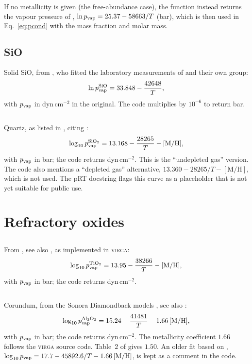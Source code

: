 \documentclass[11pt,a4paper]{article}
\newcommand{\pvap}{p_{\rm vap}}
\newcommand{\MH}{[\mathrm{M/H}]}
\newcommand{\chem}[1]{\mathrm{#1}}
\begin{document}
If no metallicity is given (the free-abundance case), the function instead
returns the \chem{MgSiO_3} vapour pressure of \citet{barshay1976},
$\ln\pvap = 25.37 - 58663/T$ (bar), which is then used in
Eq.~\eqref{eq:pcond} with the \chem{Mg_2SiO_4} mass fraction and molar mass.

\subsection{SiO}
Solid SiO, from \citet[][Eq.~3]{wetzel2013}, who fitted the laboratory
measurements of \citet{ferguson2008} and their own group:
\begin{equation}
  \ln \pvap^{\rm SiO} = 33.848 - \frac{42648}{T},
\end{equation}
with $\pvap$ in dyn\,cm$^{-2}$ in the original. The code multiplies by
$10^{-6}$ to return bar.

\subsection{\texorpdfstring{\chem{SiO_2}}{SiO2}}
Quartz, as listed in \citet{batalha2025}, citing \citet{grant2023}:
\begin{equation}
  \log_{10} \pvap^{\rm SiO_2} = 13.168 - \frac{28265}{T} - \MH ,
\end{equation}
with $\pvap$ in bar; the code returns dyn\,cm$^{-2}$. This is the
``undepleted gas'' version. The code also mentions a ``depleted gas''
alternative, $13.360 - 28265/T - \MH$, which is not used. The pRT
docstring flags this curve as a placeholder that is not yet suitable for
public use.

\section{Refractory oxides}

\subsection{\texorpdfstring{\chem{TiO_2}}{TiO2}}
From \citet{marley2021}, see also \citet{lodders2002}, as implemented in
\textsc{virga}:
\begin{equation}
  \log_{10} \pvap^{\rm TiO_2} = 13.95 - \frac{38266}{T} - \MH ,
\end{equation}
with $\pvap$ in bar; the code returns dyn\,cm$^{-2}$.

\subsection{\texorpdfstring{\chem{Al_2O_3}}{Al2O3}}
Corundum, from the Sonora Diamondback models \citep{morley2024}, see also
\citet{wakeford2017}:
\begin{equation}
  \log_{10} \pvap^{\rm Al_2O_3} = 15.24 - \frac{41481}{T} - 1.66\,\MH ,
\end{equation}
with $\pvap$ in bar; the code returns dyn\,cm$^{-2}$. The metallicity
coefficient $1.66$ follows the \textsc{virga} source code. Table~2 of
\citet{batalha2025} gives $1.50$. An older fit based on
\citet{wakeford2017}, $\log_{10}\pvap = 17.7 - 45892.6/T - 1.66\,\MH$, is
kept as a comment in the code.
\end{document}
